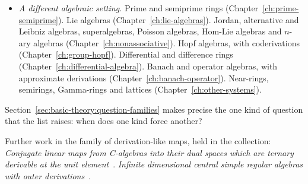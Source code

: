 \begin{itemize}
file lists every name with its count. Each chapter defines its kinds from the
sources it cites.
\item \emph{A different algebraic setting.} Prime and semiprime rings
(Chapter~\ref{ch:prime-semiprime}). Lie algebras
(Chapter~\ref{ch:lie-algebras}). Jordan, alternative and Leibniz algebras,
superalgebras, Poisson algebras, Hom-Lie algebras and $n$-ary algebras
(Chapter~\ref{ch:nonassociative}). Hopf algebras, with coderivations
(Chapter~\ref{ch:group-hopf}). Differential and difference rings
(Chapter~\ref{ch:differential-algebra}). Banach and operator algebras, with
approximate derivations (Chapter~\ref{ch:banach-operator}). Near-rings, semirings,
Gamma-rings and lattices (Chapter~\ref{ch:other-systems}).
\end{itemize}

Section~\ref{sec:basic-theory:question-families} makes precise the one kind of
question that the list raises: when does one kind force another?

Further work in the family of derivation-like maps, held in the collection:
\noindent\emph{Conjugate linear maps from C-algebras into their dual spaces which are ternary derivable at the unit element}~\cite{LibConjugateLinearMapsFrom2020}.
\noindent\emph{Infinite dimensional central simple regular algebras with outer derivations}~\cite{LibInfiniteDimensionalCentralSimple2020}.
